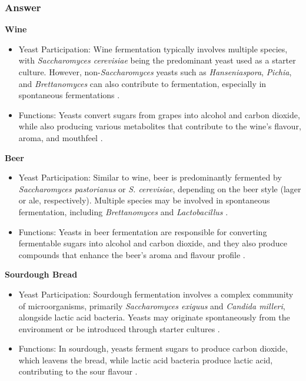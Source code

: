 \subsubsection*{Answer}
\textbf{Wine}
\begin{itemize}
    \item Yeast Participation: Wine fermentation typically involves multiple species, with \textit{Saccharomyces cerevisiae} being the predominant yeast used as a starter culture. However, non-\textit{Saccharomyces} yeasts such as \textit{Hanseniaspora}, \textit{Pichia}, and \textit{Brettanomyces} can also contribute to fermentation, especially in spontaneous fermentations \cite*{L9-ISAPP}.
    \item Functions: Yeasts convert sugars from grapes into alcohol and carbon dioxide, while also producing various metabolites that contribute to the wine's flavour, aroma, and mouthfeel \cite*{L6-Yeasts,L9-ISAPP}.
\end{itemize}

\vspace*{0.5em}
\textbf{Beer}
\begin{itemize}
    \item Yeast Participation: Similar to wine, beer is predominantly fermented by \textit{Saccharomyces pastorianus} or \textit{S. cerevisiae}, depending on the beer style (lager or ale, respectively). Multiple species may be involved in spontaneous fermentation, including \textit{Brettanomyces} and \textit{Lactobacillus} \cite*{L6-Yeasts, L9-ISAPP}.
    \item Functions: Yeasts in beer fermentation are responsible for converting fermentable sugars into alcohol and carbon dioxide, and they also produce compounds that enhance the beer's aroma and flavour profile \cite*{L6-Yeasts, L9-ISAPP}.
\end{itemize}

\vspace*{0.5em}
\textbf{Sourdough Bread}
\begin{itemize}
    \item Yeast Participation: Sourdough fermentation involves a complex community of microorganisms, primarily \textit{Saccharomyces exiguus} and \textit{Candida milleri}, alongside lactic acid bacteria. Yeasts may originate spontaneously from the environment or be introduced through starter cultures \cite*{L6-Yeasts}.
    \item Functions: In sourdough, yeasts ferment sugars to produce carbon dioxide, which leavens the bread, while lactic acid bacteria produce lactic acid, contributing to the sour flavour .
\end{itemize}

